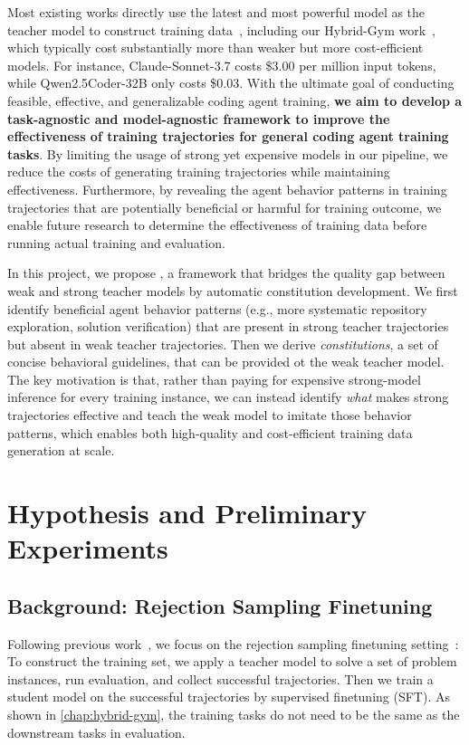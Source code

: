 Most existing works directly use the latest and most powerful model as the teacher model to construct training data~\cite{swegym,R2EGym,swe-smith,swe-play}, including our Hybrid-Gym work~\cite{hybrid-gym}, which typically cost substantially more than weaker but more cost-efficient models. 
For instance, Claude-Sonnet-3.7 costs \$3.00 per million input tokens, while Qwen2.5Coder-32B only costs \$0.03.
With the ultimate goal of conducting feasible, effective, and generalizable coding agent training, \textbf{we aim to develop a task-agnostic and model-agnostic framework to improve the effectiveness of training trajectories for general coding agent training tasks}. 
By limiting the usage of strong yet expensive models in our pipeline, we reduce the costs of generating training trajectories while maintaining effectiveness.
Furthermore, by revealing the agent behavior patterns in training trajectories that are potentially beneficial or harmful for training outcome, we enable future research to determine the effectiveness of training data before running actual training and evaluation.

In this project, we propose \plusname, a framework that bridges the quality gap between weak and strong teacher models by automatic constitution development.
We first identify beneficial agent behavior patterns (e.g., more systematic repository exploration, solution verification) that are present in strong teacher trajectories but absent in weak teacher trajectories.
Then we derive \emph{constitutions}, a set of concise behavioral guidelines, that can be provided ot the weak teacher model.
The key motivation is that, rather than paying for expensive strong-model inference for every training instance, we can instead identify \emph{what} makes strong trajectories effective and teach the weak model to imitate those behavior patterns, which enables both high-quality and cost-efficient training data generation at scale.


\section{Hypothesis and Preliminary Experiments}
\subsection{Background: Rejection Sampling Finetuning}
\label{plus:sec:preliminary}
Following previous work~\cite{swegym,R2EGym,swe-smith,swe-play,hybrid-gym}, we focus on the rejection sampling finetuning setting~\cite{rejection-sampling}:
To construct the training set, we apply a teacher model to solve a set of problem instances, run evaluation, and collect successful trajectories. 
Then we train a student model on the successful trajectories by supervised finetuning (SFT).
As shown in \autoref{chap:hybrid-gym}, the training tasks do not need to be the same as the downstream tasks in evaluation.

